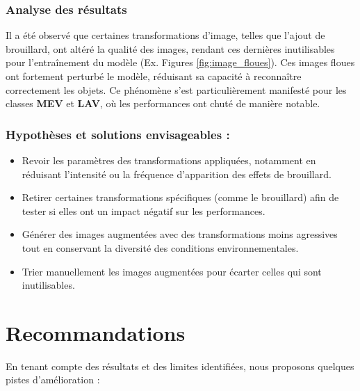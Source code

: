 \subsubsection{Analyse des résultats}

Il a été observé que certaines transformations d'image, telles que l'ajout de brouillard, ont altéré la qualité des images, rendant ces dernières inutilisables pour l'entraînement du modèle  (Ex. Figures \ref{fig:image_floues}).
Ces images floues ont fortement perturbé le modèle, réduisant sa capacité à reconnaître correctement les objets.
Ce phénomène s'est particulièrement manifesté pour les classes \textbf{MEV} et \textbf{LAV}, où les performances ont chuté de manière notable.\\


\subsubsection{Hypothèses et solutions envisageables :}

\begin{itemize}
    \item Revoir les paramètres des transformations appliquées, notamment en réduisant l’intensité ou la fréquence d’apparition des effets de brouillard.
    \item Retirer certaines transformations spécifiques (comme le brouillard) afin de tester si elles ont un impact négatif sur les performances.
    \item Générer des images augmentées avec des transformations moins agressives tout en conservant la diversité des conditions environnementales.
    \item Trier manuellement les images augmentées pour écarter celles qui sont inutilisables.
\end{itemize}

\section{Recommandations}

En tenant compte des résultats et des limites identifiées, nous proposons quelques pistes d'amélioration :

